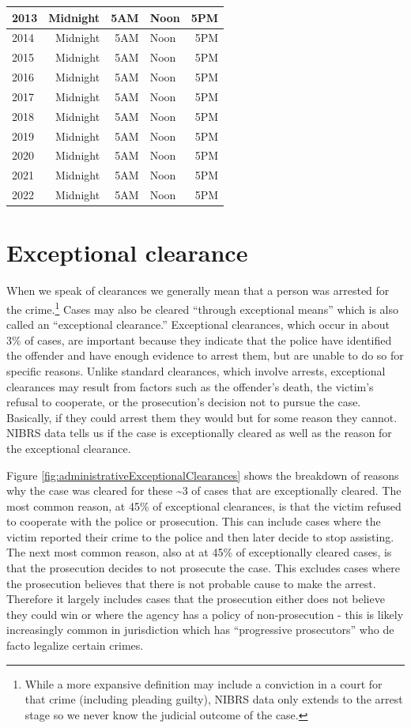 \documentclass[
]{krantz}
\begin{document}
\begin{longtable}[t]{l|r|r|l|r}
\hline
2013 & Midnight & 5AM & Noon & 5PM\\
\hline
2014 & Midnight & 5AM & Noon & 5PM\\
\hline
2015 & Midnight & 5AM & Noon & 5PM\\
\hline
2016 & Midnight & 5AM & Noon & 5PM\\
\hline
2017 & Midnight & 5AM & Noon & 5PM\\
\hline
2018 & Midnight & 5AM & Noon & 5PM\\
\hline
2019 & Midnight & 5AM & Noon & 5PM\\
\hline
2020 & Midnight & 5AM & Noon & 5PM\\
\hline
2021 & Midnight & 5AM & Noon & 5PM\\
\hline
2022 & Midnight & 5AM & Noon & 5PM\\
\hline
\end{longtable}

\section{Exceptional clearance}\label{exceptional-clearance}

When we speak of clearances we generally mean that a person
was arrested for the crime.\footnote{While a more expansive
  definition may include a conviction in a court for that
  crime (including pleading guilty), NIBRS data only extends
  to the arrest stage so we never know the judicial outcome
  of the case.} Cases may also be cleared ``through
exceptional means'' which is also called an ``exceptional
clearance.'' Exceptional clearances, which occur in about
3\% of cases, are important because they indicate that the
police have identified the offender and have enough evidence
to arrest them, but are unable to do so for specific
reasons. Unlike standard clearances, which involve arrests,
exceptional clearances may result from factors such as the
offender's death, the victim's refusal to cooperate, or the
prosecution's decision not to pursue the case. Basically, if
they could arrest them they would but for some reason they
cannot. NIBRS data tells us if the case is exceptionally
cleared as well as the reason for the exceptional clearance.

Figure \ref{fig:administrativeExceptionalClearances} shows
the breakdown of reasons why the case was cleared for these
\textasciitilde3 of cases that are exceptionally cleared.
The most common reason, at 45\% of exceptional clearances,
is that the victim refused to cooperate with the police or
prosecution. This can include cases where the victim
reported their crime to the police and then later decide to
stop assisting. The next most common reason, also at at 45\%
of exceptionally cleared cases, is that the prosecution
decides to not prosecute the case. This excludes cases where
the prosecution believes that there is not probable cause to
make the arrest. Therefore it largely includes cases that
the prosecution either does not believe they could win or
where the agency has a policy of non-prosecution - this is
likely increasingly common in jurisdiction which has
``progressive prosecutors'' who de facto legalize certain
crimes.
\end{document}

